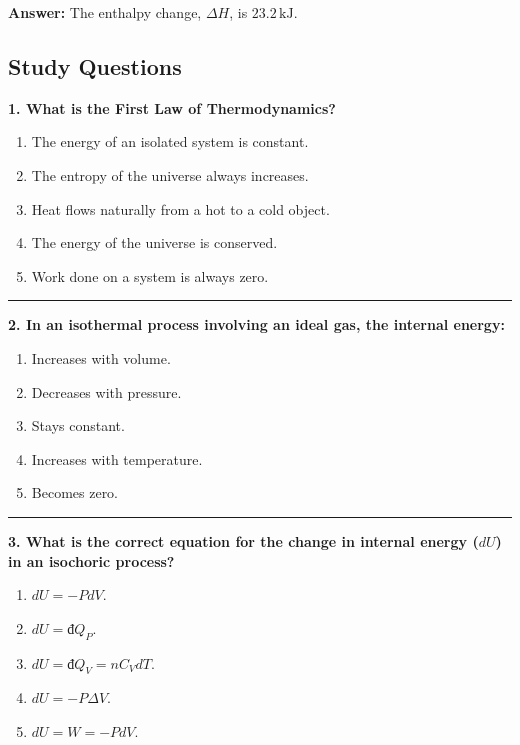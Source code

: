 \documentclass[
  9pt,
]{extbook}
\providecommand{\tightlist}{%
  \setlength{\itemsep}{0pt}\setlength{\parskip}{0pt}}
\theoremstyle{definition}
\theoremstyle{definition}
\theoremstyle{definition}
\theoremstyle{remark}
\begin{document}
\textbf{Answer:} The enthalpy change, \(\Delta H\), is \(23.2 \, \text{kJ}\).

\hypertarget{quest3}{%
\subsection{Study Questions}\label{quest3}}

\textbf{1. What is the First Law of Thermodynamics?}

\begin{enumerate}
\def\labelenumi{\alph{enumi}.}
\tightlist
\item
  The energy of an isolated system is constant.
\item
  The entropy of the universe always increases.
\item
  Heat flows naturally from a hot to a cold object.
\item
  The energy of the universe is conserved.
\item
  Work done on a system is always zero.
\end{enumerate}

\begin{center}\rule{0.5\linewidth}{0.5pt}\end{center}

\textbf{2. In an isothermal process involving an ideal gas, the internal energy:}

\begin{enumerate}
\def\labelenumi{\alph{enumi}.}
\tightlist
\item
  Increases with volume.
\item
  Decreases with pressure.
\item
  Stays constant.
\item
  Increases with temperature.
\item
  Becomes zero.
\end{enumerate}

\begin{center}\rule{0.5\linewidth}{0.5pt}\end{center}

\textbf{3. What is the correct equation for the change in internal energy (\(dU\)) in an isochoric process?}

\begin{enumerate}
\def\labelenumi{\alph{enumi}.}
\tightlist
\item
  \(dU = -P dV\).
\item
  \(dU = đQ_P\).
\item
  \(dU = đQ_V = nC_V dT\).
\item
  \(dU = -P \Delta V\).
\item
  \(dU = W = -P dV\).
\end{enumerate}
\end{document}
